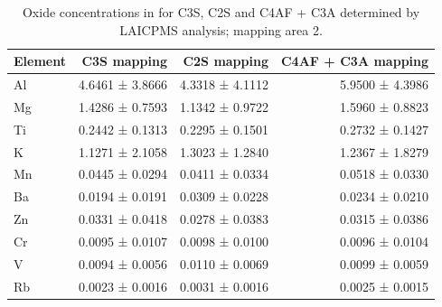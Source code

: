 \begin{table}[!htb]
	\caption{
		Oxide concentrations in \unit{\wtpercent} for \ac{C3S}, \ac{C2S} and \ac{C4AF} + \ac{C3A} determined by \ac{LAICPMS} analysis; mapping area \num{2}.
	}
	\label{tab:laicpms2-area2}
	\begin{tabular*}{\linewidth}{@{\extracolsep{\fill}} lrrr}
	\toprule
	Element & \ac{C3S} mapping & \ac{C2S} mapping & \ac{C4AF} + \ac{C3A} mapping \\ \midrule
	Al      & 4.6461 ± 3.8666    & 4.3318 ± 4.1112     & 5.9500 ± 4.3986             \\
	Mg      & 1.4286 ± 0.7593    & 1.1342 ± 0.9722     & 1.5960 ± 0.8823             \\
	Ti      & 0.2442 ± 0.1313    & 0.2295 ± 0.1501     & 0.2732 ± 0.1427             \\
	K       & 1.1271 ± 2.1058    & 1.3023 ± 1.2840     & 1.2367 ± 1.8279             \\
	Mn      & 0.0445 ± 0.0294    & 0.0411 ± 0.0334     & 0.0518 ± 0.0330             \\
	Ba      & 0.0194 ± 0.0191    & 0.0309 ± 0.0228     & 0.0234 ± 0.0210             \\
	Zn      & 0.0331 ± 0.0418    & 0.0278 ± 0.0383     & 0.0315 ± 0.0386             \\
	Cr      & 0.0095 ± 0.0107    & 0.0098 ± 0.0100     & 0.0096 ± 0.0104             \\
	V       & 0.0094 ± 0.0056    & 0.0110 ± 0.0069     & 0.0099 ± 0.0059             \\
	Rb      & 0.0023 ± 0.0016    & 0.0031 ± 0.0016     & 0.0025 ± 0.0015            \\ \bottomrule 
	\end{tabular*}
\end{table}

